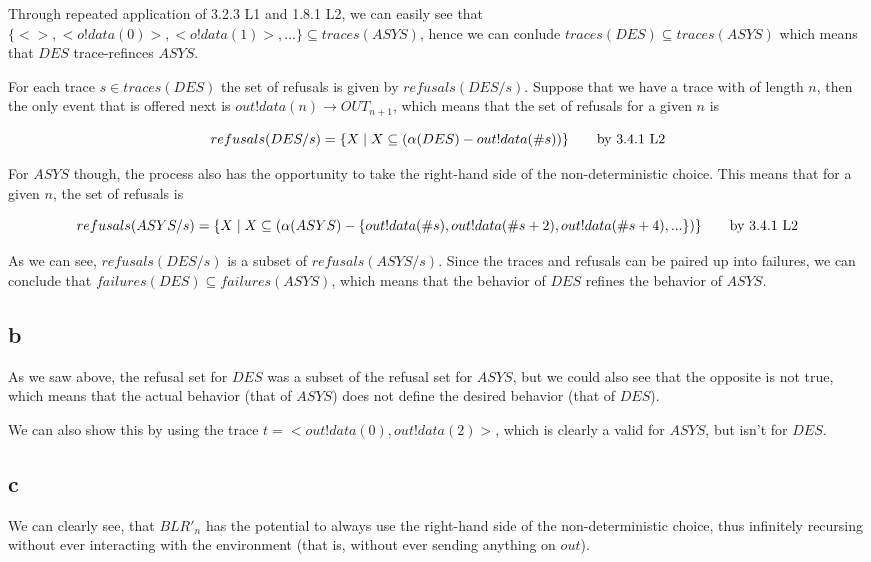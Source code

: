 \documentclass[a4paper, 10pt]{article}
\begin{document}
Through repeated application of 3.2.3 L1 and 1.8.1 L2, we can easily
see that $\{<>, <o!data(0)>, <o!data(1)>, ...\} \subseteq
traces(ASYS)$, hence we can conlude $traces(DES) \subseteq
traces(ASYS)$ which means that $DES$ trace-refinces $ASYS$.

For each trace $s \in traces(DES)$ the set of refusals is given by
$refusals(DES / s)$. Suppose that we have a trace with of length $n$,
then the only event that is offered next is $out!data(n) \to
OUT_{n+1}$, which means that the set of refusals for a given $n$ is

\begin{equation*}
  refusals(DES / s) = \{X \; | \; X \subseteq (\alpha(DES) - out!data(\#s))\} \hfill \qquad
  \text{by 3.4.1 L2}
\end{equation*}

For $ASYS$ though, the process also has the opportunity to take the
right-hand side of the non-deterministic choice. This means that for a
given $n$, the set of refusals is 

\begin{equation*}
  refusals(ASYS / s) = \{X \; | \; X \subseteq
  (\alpha(ASYS) - \{out!data(\#s), out!data(\#s+2), out!data(\#s+4), ...\})\}
  \hfill \qquad \text{by 3.4.1 L2}
\end{equation*}

As we can see, $refusals(DES / s)$ is a subset of $refusals(ASYS /
s)$. Since the traces and refusals can be paired up into failures, we
can conclude that $failures(DES) \subseteq failures(ASYS)$, which
means that the behavior of $DES$ refines the behavior of $ASYS$.

\subsection{b}

As we saw above, the refusal set for $DES$ was a subset of the refusal
set for $ASYS$, but we could also see that the opposite is not true,
which means that the actual behavior (that of $ASYS$) does not define
the desired behavior (that of $DES$).

We can also show this by using the trace $t = <out!data(0),
out!data(2)>$, which is clearly a valid for $ASYS$, but isn't for
$DES$.

\subsection{c}

We can clearly see, that $BLR'_n$ has the potential to always use the
right-hand side of the non-deterministic choice, thus infinitely
recursing without ever interacting with the environment (that is,
without ever sending anything on $out$).
\end{document}
